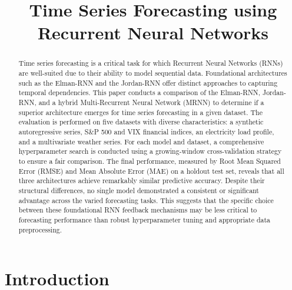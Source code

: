 \documentclass[conference, 10pt]{IEEEtran}
\begin{document}
\title{Time Series Forecasting using Recurrent Neural Networks}

\author{
}

\maketitle

\begin{abstract}
    Time series forecasting is a critical task for which Recurrent Neural Networks (RNNs) are well-suited due to their
    ability to model sequential data. Foundational architectures such as the Elman-RNN and the Jordan-RNN offer distinct
    approaches to capturing temporal dependencies. This paper conducts a comparison of the Elman-RNN, Jordan-RNN, and a
    hybrid Multi-Recurrent Neural Network (MRNN) to determine if a superior architecture emerges for time series
    forecasting in a given dataset. The evaluation is performed on five datasets with diverse characteristics: a
    synthetic autoregressive series, S\&P 500 and VIX financial indices, an electricity load profile, and a multivariate
    weather series. For each model and dataset, a comprehensive hyperparameter search is conducted using a
    growing-window cross-validation strategy to ensure a fair comparison. The final performance, measured by Root Mean
    Squared Error (RMSE) and Mean Absolute Error (MAE) on a holdout test set, reveals that all three architectures
    achieve remarkably similar predictive accuracy. Despite their structural differences, no single model demonstrated a
    consistent or significant advantage across the varied forecasting tasks. This suggests that the specific choice
    between these foundational RNN feedback mechanisms may be less critical to forecasting performance than robust
    hyperparameter tuning and appropriate data preprocessing.
\end{abstract}



\section{Introduction}
\end{document}
